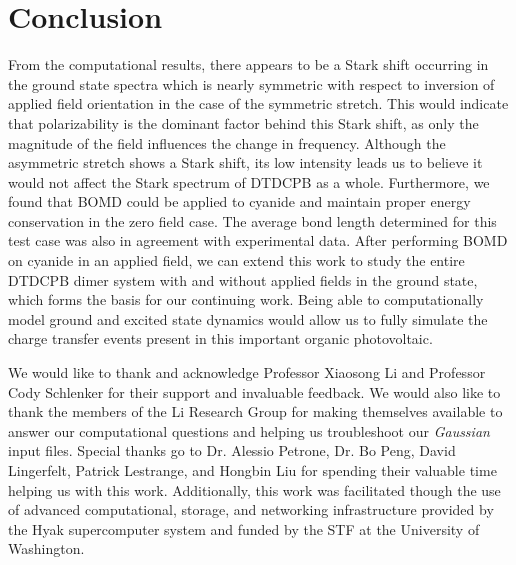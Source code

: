 \documentclass[journal=jpclcd, manuscript=letter, layout=twocolumn]{achemso}
\begin{document}
 


\section{Conclusion}

\par From the computational results, there appears to be a Stark shift occurring in the ground state spectra which is nearly symmetric with respect to inversion of applied field orientation in the case of the symmetric stretch. This would indicate that polarizability is the dominant factor behind this Stark shift, as only the magnitude of the field influences the change in frequency. Although the asymmetric stretch shows a Stark shift, its low intensity leads us to believe it would not affect the Stark spectrum of DTDCPB as a whole. Furthermore, we found that BOMD could be applied to  cyanide and maintain proper energy conservation in the zero field case. The average bond length determined for this test case was also in agreement with experimental data. After performing BOMD on cyanide in an applied field, we can extend this work to study the entire DTDCPB dimer system with and without applied fields in the ground state, which forms the basis for our continuing work. Being able to computationally model ground and excited state dynamics would allow us to fully simulate the charge transfer events present in this important organic photovoltaic.

\pagebreak

\begin{acknowledgement}

We would like to thank and acknowledge Professor Xiaosong Li and Professor Cody Schlenker for their support and invaluable feedback.  We would also like to thank the members of the Li Research Group for making themselves available to answer our computational questions and helping us troubleshoot our \emph{Gaussian} input files.  Special thanks go to Dr. Alessio Petrone, Dr. Bo Peng, David Lingerfelt, Patrick Lestrange, and Hongbin Liu for spending their valuable time helping us with this work. Additionally, this work was facilitated though the use of advanced computational, storage, and networking infrastructure provided by the Hyak supercomputer system and funded by the STF at the University of Washington.

\end{acknowledgement}

{}
\end{document}
